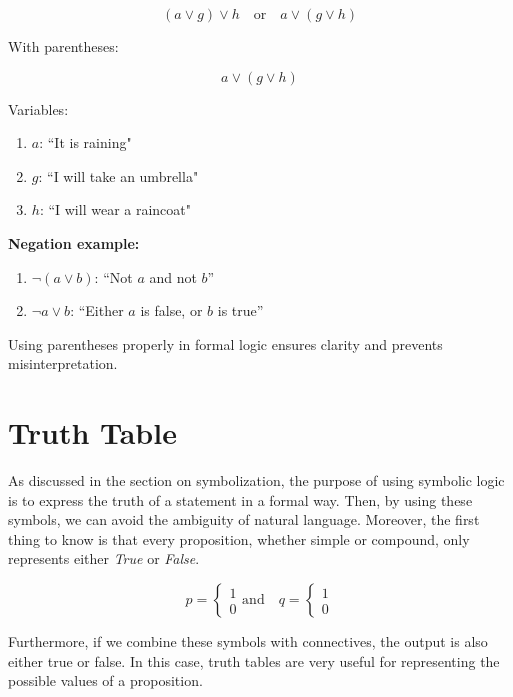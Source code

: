 \documentclass[12pt,a4paper,openany]{article}
\begin{document}
\[
(a \lor g) \lor h \quad \text{or} \quad a \lor (g \lor h)
\]

With parentheses:

\[
a \lor (g \lor h)
\]

Variables:

\begin{enumerate}
\item \(a\): ``It is raining"
\item \(g\): ``I will take an umbrella"
\item \(h\): ``I will wear a raincoat"
\end{enumerate}

\textbf{Negation example:}

\begin{enumerate}
\item \(\lnot (a \lor b)\): ``Not \(a\) and not \(b\)'' 
\item \(\lnot a \lor b\): ``Either \(a\) is false, or \(b\) is true''
\end{enumerate}

Using parentheses properly in formal logic ensures clarity and prevents
misinterpretation.

\section{Truth Table}

As discussed in the section on symbolization, the purpose of using
symbolic logic is to express the truth of a statement in a formal way.
Then, by using these symbols, we can avoid the ambiguity of natural
language. Moreover, the first thing to know is that every proposition,
whether simple or compound, only represents either \emph{True} or
\emph{False}.


\vspace{4mm}
\[
p = \begin{cases} 1 \\ 0 \end{cases} \text{and} \quad 
q = \begin{cases} 1 \\ 0 \end{cases}
\]
\vspace{4mm}



Furthermore, if we combine these symbols with connectives, the output is
also either true or false. In this case, truth tables are very useful
for representing the possible values of a proposition.
\end{document}
